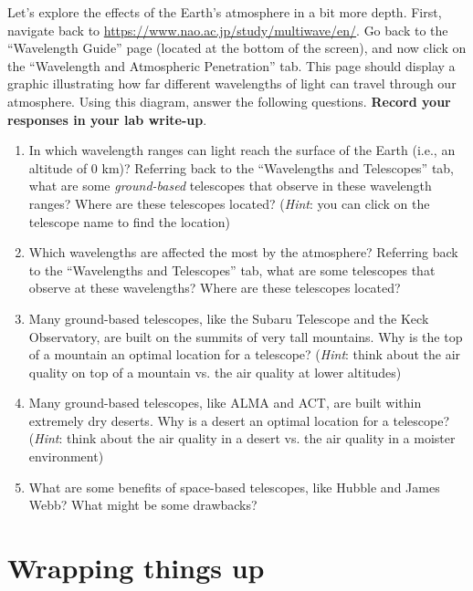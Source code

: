 \documentclass[11pt]{article}
\begin{document}
\medskip \noindent
Let's explore the effects of the Earth's atmosphere in a bit more depth. First, navigate back to \url{https://www.nao.ac.jp/study/multiwave/en/}. Go back to the ``Wavelength Guide'' page (located at the bottom of the screen), and now click on the ``Wavelength and Atmospheric Penetration'' tab. This page should display a graphic illustrating how far different wavelengths of light can travel through our atmosphere. Using this diagram, answer the following questions. \textbf{Record your responses in your lab write-up}.
\begin{enumerate}
    \item In which wavelength ranges can light reach the surface of the Earth (i.e., an altitude of 0 km)? Referring back to the ``Wavelengths and Telescopes'' tab, what are some \emph{ground-based} telescopes that observe in these wavelength ranges? Where are these telescopes located? (\textit{Hint}: you can click on the telescope name to find the location)
    
    \item Which wavelengths are affected the most by the atmosphere? Referring back to the ``Wavelengths and Telescopes'' tab, what are some telescopes that observe at these wavelengths? Where are these telescopes located?
    
    \item Many ground-based telescopes, like the Subaru Telescope and the Keck Observatory, are built on the summits of very tall mountains. Why is the top of a mountain an optimal location for a telescope? (\textit{Hint}: think about the air quality on top of a mountain vs. the air quality at lower altitudes)
    
    \item Many ground-based telescopes, like ALMA and ACT, are built within extremely dry deserts. Why is a desert an optimal location for a telescope? (\textit{Hint}: think about the air quality in a desert vs. the air quality in a moister environment)
    
    \item What are some benefits of space-based telescopes, like Hubble and James Webb? What might be some drawbacks?
\end{enumerate}

\section{Wrapping things up}
\end{document}
